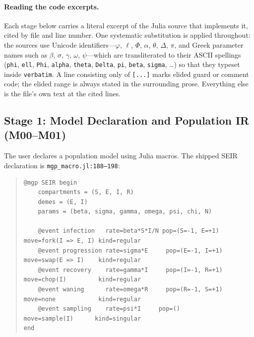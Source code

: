 \documentclass[11pt,leqno]{article}
\newcommand{\code}[1]{\texttt{#1}}
\theoremstyle{plain}
\theoremstyle{definition}
\begin{document}
\paragraph{Reading the code excerpts.}
Each stage below carries a literal excerpt of the Julia source that implements
it, cited by file and line number.  One systematic substitution is applied
throughout: the sources use Unicode identifiers---$\varphi$, $\ell$, $\Phi$,
$\alpha$, $\theta$, $\Delta$, $\pi$, and Greek parameter names such as
$\beta$, $\sigma$, $\gamma$, $\omega$, $\psi$---which are transliterated to
their ASCII spellings (\code{phi}, \code{ell}, \code{Phi}, \code{alpha},
\code{theta}, \code{Delta}, \code{pi}, \code{beta}, \code{sigma}, \ldots) so
that they typeset inside \code{verbatim}.  A line consisting only of
\code{[...]} marks elided guard or comment code; the elided range is always
stated in the surrounding prose.  Everything else is the file's own text at
the cited lines.

\subsection{Stage 1: Model Declaration and Population IR (M00--M01)}

The user declares a population model using Julia macros.  The shipped SEIR
declaration is \code{mgp\_macro.jl:188--198}:
\begin{quote}
{\footnotesize
\begin{verbatim}
@mgp SEIR begin
    compartments = (S, E, I, R)
    demes = (E, I)
    params = (beta, sigma, gamma, omega, psi, chi, N)

    @event infection   rate=beta*S*I/N pop=(S=-1, E=+1) move=fork(I => E, I) kind=regular
    @event progression rate=sigma*E     pop=(E=-1, I=+1) move=swap(E => I)    kind=regular
    @event recovery    rate=gamma*I     pop=(I=-1, R=+1) move=chop(I)         kind=regular
    @event waning      rate=omega*R     pop=(R=-1, S=+1) move=none            kind=regular
    @event sampling    rate=psi*I     pop=()           move=sample(I)      kind=singular
end
\end{verbatim}
}
\end{quote}
\end{document}
